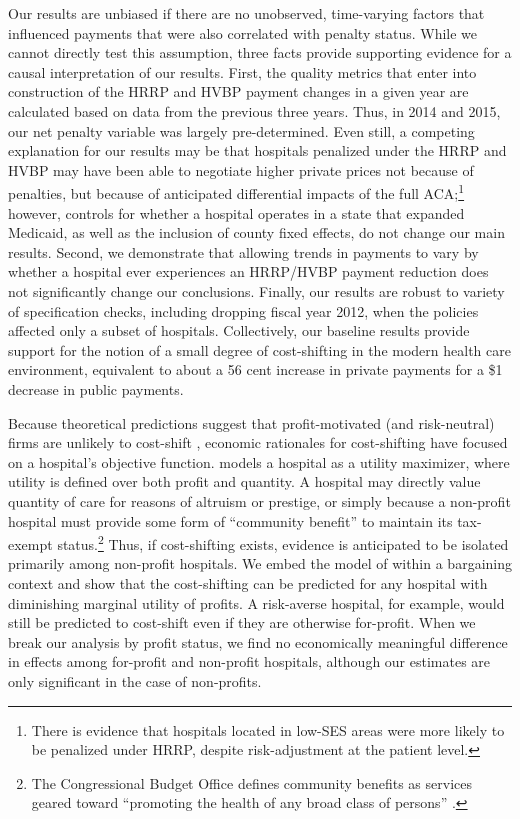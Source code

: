 \documentclass[12pt]{article}
\begin{document}
Our results are unbiased if there are no unobserved, time-varying factors that influenced payments that were also correlated with penalty status.  While we cannot directly test this assumption, three facts provide supporting evidence for a causal interpretation of our results.  First, the quality metrics that enter into construction of the HRRP and HVBP payment changes in a given year are calculated based on data from the previous three years.  Thus, in 2014 and 2015, our net penalty variable was largely pre-determined.  Even still, a competing explanation for our results may be that hospitals penalized under the HRRP and HVBP may have been able to negotiate higher private prices not because of penalties, but because of anticipated differential impacts of the full ACA;\footnote{There is evidence that hospitals located in low-SES areas were more likely to be penalized under HRRP, despite risk-adjustment at the patient level.} however, controls for whether a hospital operates in a state that expanded Medicaid, as well as the inclusion of county fixed effects, do not change our main results. Second, we demonstrate that allowing trends in payments to vary by whether a hospital ever experiences an HRRP/HVBP payment reduction does not significantly change our conclusions. Finally, our results are robust to variety of specification checks, including dropping fiscal year 2012, when the policies affected only a subset of hospitals.  Collectively, our baseline results provide support for the notion of a small degree of cost-shifting in the modern health care environment, equivalent to about a 56 cent increase in private payments for a \$1 decrease in public payments.

Because theoretical predictions suggest that profit-motivated (and risk-neutral) firms are unlikely to cost-shift \citep{hay1983}, economic rationales for cost-shifting have focused on a hospital's objective function.  \cite{dranove1988} models a hospital as a utility maximizer, where utility is defined over both profit and quantity.  A hospital may directly value quantity of care for reasons of altruism or prestige, or simply because a non-profit hospital must provide some form of ``community benefit'' to maintain its tax-exempt status.\footnote{The Congressional Budget Office defines community benefits as services geared toward ``promoting the health of any broad class of persons'' \citep{cbo2006}.}  Thus, if cost-shifting exists, evidence is anticipated to be isolated primarily among non-profit hospitals. We embed the model of \cite{dranove1988} within a bargaining context and show that the cost-shifting can be predicted for any hospital with diminishing marginal utility of profits. A risk-averse hospital, for example, would still be predicted to cost-shift even if they are otherwise for-profit. When we break our analysis by profit status, we find no economically meaningful difference in effects among for-profit and non-profit hospitals, although our estimates are only significant in the case of non-profits.
\end{document}
